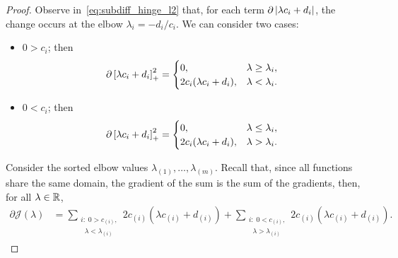 \begin{proof}
    Observe in~\eqref{eq:subdiff_hinge_l2} that, for each term $\partial \left|\lambda c_i + d_i\right|$, the change occurs at the elbow $\lambda_{i} = - d_ i / c_i$. We can consider two cases:
    \begin{itemize}
        \item $0 > c_i$; then
        \begin{equation}
            \nonumber
            \begin{aligned}
                \partial \left[\lambda c_i + d_i\right]_{+}^2 = 
                \begin{cases}
                    0 ,& \lambda \geq \lambda_i , \\
                    2 c_i (\lambda c_i + d_i) ,& \lambda < \lambda_i .\\
                \end{cases}
            \end{aligned}
        \end{equation}
        \item $0 < c_i$; then
        \begin{equation}
            \nonumber
            \begin{aligned}
                \partial \left[\lambda c_i + d_i\right]_{+}^2 = 
                \begin{cases}
                    0 ,& \lambda \leq \lambda_i ,\\
                    2 c_i (\lambda c_i + d_i) ,& \lambda > \lambda_i . \\
                \end{cases}
            \end{aligned}
        \end{equation}
    \end{itemize}
    Consider the sorted elbow values $\lambda_{(1)}, \ldots, \lambda_{(m)}$.
    Recall that, since all functions share the same domain, the gradient of the sum is the sum of the gradients, then, for all $\lambda \in \mathbb{R}$,
    \begin{equation}\nonumber
        \begin{aligned}
            \partial \mathcal{J}(\lambda) &=  \sum_{\substack{i:\; 0 > c_{(i)},\\ \;\; \lambda < \lambda_{(i)}}} {2 c_{(i)} (\lambda c_{(i)} + d_{(i)})} + \sum_{\substack{i:\; 0 < c_{(i)},\\ \;\; \lambda > \lambda_{(i)}}} {2 c_{(i)} (\lambda c_{(i)} + d_{(i)})}  .
        \end{aligned}        

\end{equation}
\end{proof}
